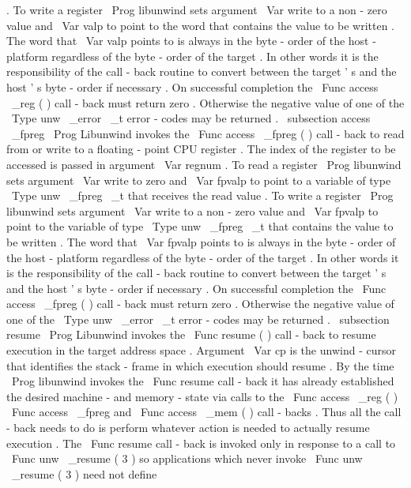 .
To
write
a
register
\
Prog
{
libunwind
}
sets
argument
\
Var
{
write
}
to
a
non
-
zero
value
and
\
Var
{
valp
}
to
point
to
the
word
that
contains
the
value
to
be
written
.
The
word
that
\
Var
{
valp
}
points
to
is
always
in
the
byte
-
order
of
the
host
-
platform
regardless
of
the
byte
-
order
of
the
target
.
In
other
words
it
is
the
responsibility
of
the
call
-
back
routine
to
convert
between
the
target
'
s
and
the
host
'
s
byte
-
order
if
necessary
.
On
successful
completion
the
\
Func
{
access
\
_reg
}
(
)
call
-
back
must
return
zero
.
Otherwise
the
negative
value
of
one
of
the
\
Type
{
unw
\
_error
\
_t
}
error
-
codes
may
be
returned
.
\
subsection
{
access
\
_fpreg
}
\
Prog
{
Libunwind
}
invokes
the
\
Func
{
access
\
_fpreg
}
(
)
call
-
back
to
read
from
or
write
to
a
floating
-
point
CPU
register
.
The
index
of
the
register
to
be
accessed
is
passed
in
argument
\
Var
{
regnum
}
.
To
read
a
register
\
Prog
{
libunwind
}
sets
argument
\
Var
{
write
}
to
zero
and
\
Var
{
fpvalp
}
to
point
to
a
variable
of
type
\
Type
{
unw
\
_fpreg
\
_t
}
that
receives
the
read
value
.
To
write
a
register
\
Prog
{
libunwind
}
sets
argument
\
Var
{
write
}
to
a
non
-
zero
value
and
\
Var
{
fpvalp
}
to
point
to
the
variable
of
type
\
Type
{
unw
\
_fpreg
\
_t
}
that
contains
the
value
to
be
written
.
The
word
that
\
Var
{
fpvalp
}
points
to
is
always
in
the
byte
-
order
of
the
host
-
platform
regardless
of
the
byte
-
order
of
the
target
.
In
other
words
it
is
the
responsibility
of
the
call
-
back
routine
to
convert
between
the
target
'
s
and
the
host
'
s
byte
-
order
if
necessary
.
On
successful
completion
the
\
Func
{
access
\
_fpreg
}
(
)
call
-
back
must
return
zero
.
Otherwise
the
negative
value
of
one
of
the
\
Type
{
unw
\
_error
\
_t
}
error
-
codes
may
be
returned
.
\
subsection
{
resume
}
\
Prog
{
Libunwind
}
invokes
the
\
Func
{
resume
}
(
)
call
-
back
to
resume
execution
in
the
target
address
space
.
Argument
\
Var
{
cp
}
is
the
unwind
-
cursor
that
identifies
the
stack
-
frame
in
which
execution
should
resume
.
By
the
time
\
Prog
{
libunwind
}
invokes
the
\
Func
{
resume
}
call
-
back
it
has
already
established
the
desired
machine
-
and
memory
-
state
via
calls
to
the
\
Func
{
access
\
_reg
}
(
)
\
Func
{
access
\
_fpreg
}
and
\
Func
{
access
\
_mem
}
(
)
call
-
backs
.
Thus
all
the
call
-
back
needs
to
do
is
perform
whatever
action
is
needed
to
actually
resume
execution
.
The
\
Func
{
resume
}
call
-
back
is
invoked
only
in
response
to
a
call
to
\
Func
{
unw
\
_resume
}
(
3
)
so
applications
which
never
invoke
\
Func
{
unw
\
_resume
}
(
3
)
need
not
define
